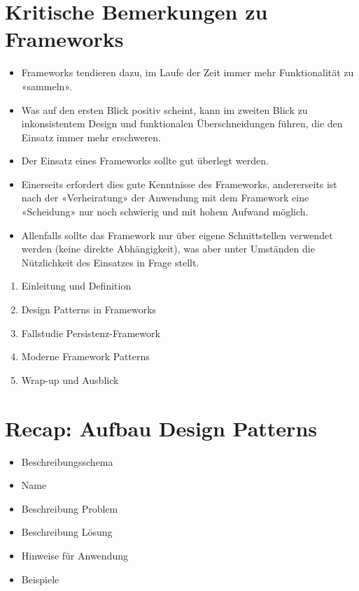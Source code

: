 \documentclass[10pt]{article}
\begin{document}
\section*{Kritische Bemerkungen zu Frameworks}
\begin{itemize}
  \item Frameworks tendieren dazu, im Laufe der Zeit immer mehr Funktionalität zu «sammeln».
  \item Was auf den ersten Blick positiv scheint, kann im zweiten Blick zu inkonsistentem Design und funktionalen Überschneidungen führen, die den Einsatz immer mehr erschweren.
  \item Der Einsatz eines Frameworks sollte gut überlegt werden.
  \item Einerseits erfordert dies gute Kenntnisse des Frameworks, andererseits ist nach der «Verheiratung» der Anwendung mit dem Framework eine «Scheidung» nur noch schwierig und mit hohem Aufwand möglich.
  \item Allenfalls sollte das Framework nur über eigene Schnittstellen verwendet werden (keine direkte Abhängigkeit), was aber unter Umständen die Nützlichkeit des Einsatzes in Frage stellt.
\end{itemize}

\begin{enumerate}
  \item Einleitung und Definition
  \item Design Patterns in Frameworks
  \item Fallstudie Persistenz-Framework
  \item Moderne Framework Patterns
  \item Wrap-up und Ausblick
\end{enumerate}

\section*{Recap: Aufbau Design Patterns}
\begin{itemize}
  \item Beschreibungsschema
  \item Name
  \item Beschreibung Problem
  \item Beschreibung Lösung
  \item Hinweise für Anwendung
  \item Beispiele
\end{itemize}
\end{document}
